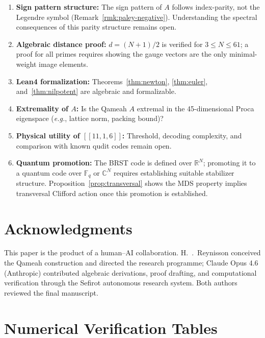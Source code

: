 \documentclass[aip,jmp,reprint,superscriptaddress,floatfix,nofootinbib]{revtex4-2}
\theoremstyle{definition}
\theoremstyle{remark}
\newcommand{\eg}{\textit{e.g.}}
\begin{document}
\begin{enumerate}[label=(\arabic*)]
\item \textbf{Sign pattern structure:}
  The sign pattern of $A$ follows index-parity, not the Legendre symbol
  (Remark~\ref{rmk:paley-negative}).  Understanding the spectral
  consequences of this parity structure remains open.
\item \textbf{Algebraic distance proof:}
  $d = (N{+}1)/2$ is verified for $3 \le N \le 61$; a proof for all
  primes requires showing the gauge vectors are the only
  minimal-weight image elements.
\item \textbf{Lean4 formalization:}
  Theorems~\ref{thm:newton}, \ref{thm:euler},
  and~\ref{thm:nilpotent} are algebraic and formalizable.
\item \textbf{Extremality of $A$:}
  Is the Qameah $A$ extremal in the 45-dimensional Proca eigenspace
  (\eg, lattice norm, packing bound)?
\item \textbf{Physical utility of $[[11,1,6]]$:}
  Threshold, decoding complexity, and comparison with known qudit
  codes remain open.
\item \textbf{Quantum promotion:}
  The BRST code is defined over $\mathbb{R}^N$; promoting it to a
  quantum code over $\mathbb{F}_q$ or $\mathbb{C}^N$ requires
  establishing suitable stabilizer structure.
  Proposition~\ref{prop:transversal} shows the MDS property implies
  transversal Clifford action once this promotion is established.
\end{enumerate}

\section*{Acknowledgments}

This paper is the product of a human--AI collaboration.
H.~{\TH}.~Reynisson conceived the Qameah construction and directed the
research programme; Claude Opus 4.6 (Anthropic) contributed algebraic
derivations, proof drafting, and computational verification through the
Sefirot autonomous research system.  Both authors reviewed the final
manuscript.

\appendix

\section{Numerical Verification Tables}
\label{app:numerics}
\end{document}
